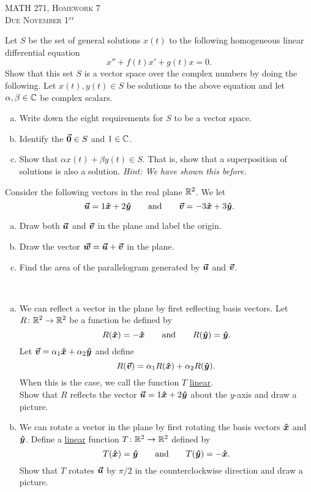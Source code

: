 \documentclass[12pt]{article} %
\begin{document}
\begin{center}
   \textsc{\large MATH 271, Homework 7}\\
   \textsc{Due November 1$^\textrm{st}$}
\end{center}
\vspace{.5cm}

\begin{problem}
Let $S$ be the set of general solutions $x(t)$ to the following homogeneous linear differential equation 
\[
x''+f(t)x'+g(t)x=0.
\]
Show that this set $S$ is a vector space over the complex numbers by doing the following. Let $x(t),y(t) \in S$ be solutions to the above equation and let $\alpha, \beta \in \mathbb{C}$ be complex scalars.
\begin{enumerate}[(a)]
    \item Write down the eight requirements for $S$ to be a vector space.  
    \item Identify the $\boldsymbol{\vec{0}} \in S$ and $1\in \mathbb{C}$. 
    \item Show that $\alpha x(t) + \beta y(t) \in S$. That is, show that a superposition of solutions is also a solution. \emph{Hint: We have shown this before.}
\end{enumerate}
\end{problem}

\begin{problem}
Consider the following vectors in the real plane $\mathbb{R}^2$. We let
\[
\boldsymbol{\vec{u}} = 1\boldsymbol{\hat{x}} + 2\boldsymbol{\hat{y}} \qquad \textrm{and} \qquad \boldsymbol{\vec{v}} = -3\boldsymbol{\hat{x}}+ 3\boldsymbol{\hat{y}}.
\]
\begin{enumerate}[(a)]
    \item Draw both $\boldsymbol{\vec{u}}$ and $\boldsymbol{\vec{v}}$ in the plane and label the origin.
    \item Draw the vector $\boldsymbol{\vec{w}} = \boldsymbol{\vec{u}}+\boldsymbol{\vec{v}}$ in the plane.
    \item Find the area of the parallelogram generated by $\boldsymbol{\vec{u}}$ and $\boldsymbol{\vec{v}}$.
\end{enumerate}
\end{problem}

\begin{problem}~
\begin{enumerate}[(a)]
    \item We can reflect a vector in the plane by first reflecting basis vectors. Let $R\colon \mathbb{R}^2 \to \mathbb{R}^2$ be a function be defined by 
    \[
    R(\boldsymbol{\hat{x}}) = -\boldsymbol{\hat{x}} \qquad \textrm{and} \qquad R(\boldsymbol{\hat{y}})=\boldsymbol{\hat{y}}.
    \]
    Let $\boldsymbol{\vec{v}} = \alpha_1 \boldsymbol{\hat{x}} + \alpha_2 \boldsymbol{\hat{y}}$ and define
    \[
    R(\boldsymbol{\vec{v}}) = \alpha_1 R(\boldsymbol{\hat{x}}) + \alpha_2 R(\boldsymbol{\hat{y}}).
    \]
    When this is the case, we call the function $T$ \underline{linear}.\\
    \noindent Show that $R$ reflects the vector $\boldsymbol{\vec{u}} = 1\boldsymbol{\hat{x}} + 2\boldsymbol{\hat{y}}$ about the $y$-axis and draw a picture.
    \item We can rotate a vector in the plane by first rotating the basis vectors $\boldsymbol{\hat{x}}$ and $\boldsymbol{\hat{y}}$. Define a \underline{linear} function $T\colon \mathbb{R}^2 \to \mathbb{R}^2$ defined by
    \[
    T(\boldsymbol{\hat{x}})=\boldsymbol{\hat{y}} \qquad \textrm{and} \qquad T(\boldsymbol{\hat{y}})=-\boldsymbol{\hat{x}}.
    \]
    \noindent Show that $T$ rotates $\boldsymbol{\vec{u}}$ by $\pi/2$ in the counterclockwise direction and draw a picture.
\end{enumerate}
\end{problem}
\end{document}
